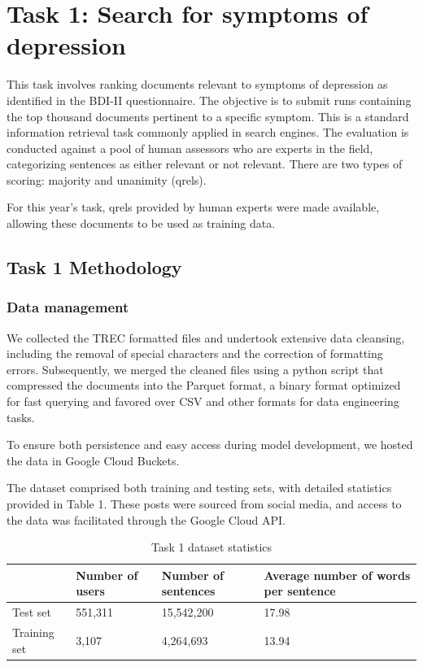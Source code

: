 \documentclass[]{style/ceurart}
\begin{document}
\section{Task 1: Search for symptoms of depression}

This task involves ranking documents relevant to symptoms of depression as identified in the BDI-II questionnaire. The objective is to submit runs containing the top thousand documents pertinent to a specific symptom. This is a standard information retrieval task commonly applied in search engines. The evaluation is conducted against a pool of human assessors who are experts in the field, categorizing sentences as either relevant or not relevant. There are two types of scoring: majority and unanimity (qrels).

For this year's task, qrels provided by human experts were made available, allowing these documents to be used as training data.

\subsection{Task 1 Methodology}

\subsubsection{Data management}
We collected the TREC formatted files and undertook extensive data cleansing, including the removal of special characters and the correction of formatting errors. Subsequently, we merged the cleaned files using a python script that compressed the documents into the Parquet format, a binary format optimized for fast querying and favored over CSV and other formats for data engineering tasks.

To ensure both persistence and easy access during model development, we hosted the data in Google Cloud Buckets.

The dataset comprised both training and testing sets, with detailed statistics provided in Table 1. These posts were sourced from social media, and access to the data was facilitated through the Google Cloud API.


\begin{table}[]
\caption{Task 1 dataset statistics}
\begin{tabular}{llll}
             & Number of users & Number of sentences & Average number of words per sentence \\ \hline
Test set     & 551,311         & 15,542,200          & 17.98                                \\ \hline
Training set & 3,107           & 4,264,693           & 13.94                                \\ \hline
\end{tabular}
\end{table}
\end{document}

